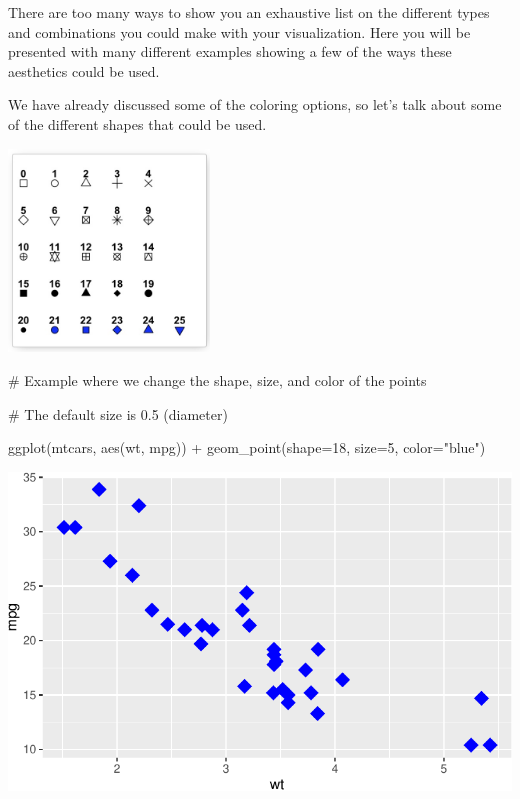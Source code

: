 \documentclass[
  letterpaper,
  DIV=11,
  numbers=noendperiod]{scrreprt}
\newenvironment{Shaded}{\begin{snugshade}}{\end{snugshade}}
\newcommand{\AttributeTok}[1]{\textcolor[rgb]{0.40,0.45,0.13}{#1}}
\newcommand{\CommentTok}[1]{\textcolor[rgb]{0.37,0.37,0.37}{#1}}
\newcommand{\DecValTok}[1]{\textcolor[rgb]{0.68,0.00,0.00}{#1}}
\newcommand{\FunctionTok}[1]{\textcolor[rgb]{0.28,0.35,0.67}{#1}}
\newcommand{\NormalTok}[1]{\textcolor[rgb]{0.00,0.23,0.31}{#1}}
\newcommand{\SpecialCharTok}[1]{\textcolor[rgb]{0.37,0.37,0.37}{#1}}
\newcommand{\StringTok}[1]{\textcolor[rgb]{0.13,0.47,0.30}{#1}}
\begin{document}
There are too many ways to show you an exhaustive list on the different
types and combinations you could make with your visualization. Here you
will be presented with many different examples showing a few of the ways
these aesthetics could be used.

We have already discussed some of the coloring options, so let's talk
about some of the different shapes that could be used.

\includegraphics[width=0.4\textwidth,height=\textheight]{./images/AST_2.jpg}

\begin{Shaded}
\begin{Highlighting}[]
\CommentTok{\# Example where we change the shape, size, and color of the points}

\CommentTok{\# The default size is 0.5 (diameter)}

\FunctionTok{ggplot}\NormalTok{(mtcars, }\FunctionTok{aes}\NormalTok{(wt, mpg)) }\SpecialCharTok{+} 
  \FunctionTok{geom\_point}\NormalTok{(}\AttributeTok{shape=}\DecValTok{18}\NormalTok{, }\AttributeTok{size=}\DecValTok{5}\NormalTok{, }\AttributeTok{color=}\StringTok{"blue"}\NormalTok{)}
\end{Highlighting}
\end{Shaded}

\includegraphics{Advanced_Scatterplot_Techniques_files/figure-pdf/unnamed-chunk-5-1.pdf}
\end{document}
